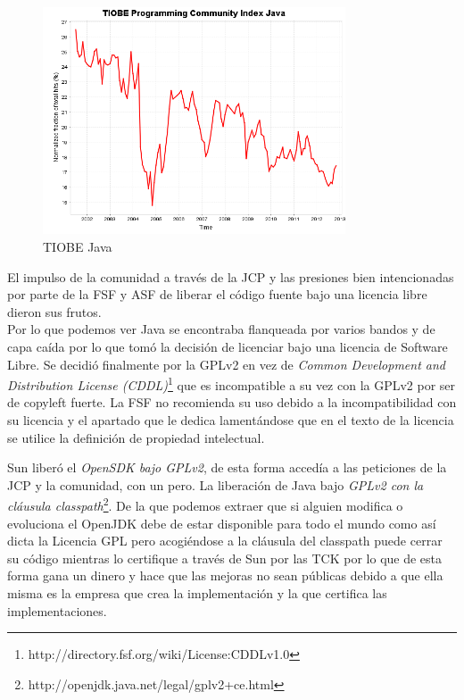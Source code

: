 \documentclass[11pt]{scrartcl}
\begin{document}
\begin{figure}[H]
  \centering
  \includegraphics[width=0.8\textwidth]{images/history_Java}
  \caption{TIOBE Java}
  \label{fig:tiobejava}
\end{figure}

El impulso de la comunidad a través de la JCP y las presiones bien intencionadas por parte de la FSF y ASF de liberar el código fuente bajo una licencia libre dieron sus frutos.\\
Por lo que podemos ver Java se encontraba flanqueada por varios bandos y de capa caída por lo que tomó la decisión de licenciar bajo una licencia de Software Libre. Se decidió finalmente por la GPLv2 en vez de \emph{Common Development and Distribution License (CDDL)}\footnote{http://directory.fsf.org/wiki/License:CDDLv1.0} que es incompatible a su vez con la GPLv2 por ser de copyleft fuerte. La FSF no recomienda su uso debido a la incompatibilidad con su licencia y el apartado que le dedica lamentándose que en el texto de la licencia se utilice la definición de propiedad intelectual.

Sun liberó el \emph{OpenSDK bajo GPLv2}, de esta forma accedía a las peticiones de la JCP y la comunidad, con un pero. La liberación de Java bajo \emph{GPLv2 con la cláusula classpath}\footnote{http://openjdk.java.net/legal/gplv2+ce.html}. De la que podemos extraer que si alguien modifica o evoluciona el OpenJDK debe de estar disponible para todo el mundo como así dicta la Licencia GPL pero acogiéndose a la cláusula del classpath puede cerrar su código mientras lo certifique a través de Sun por las TCK por lo que de esta forma gana un dinero y hace que las mejoras no sean públicas debido a que ella misma es la empresa que crea la implementación y la que certifica las implementaciones.
\end{document}
